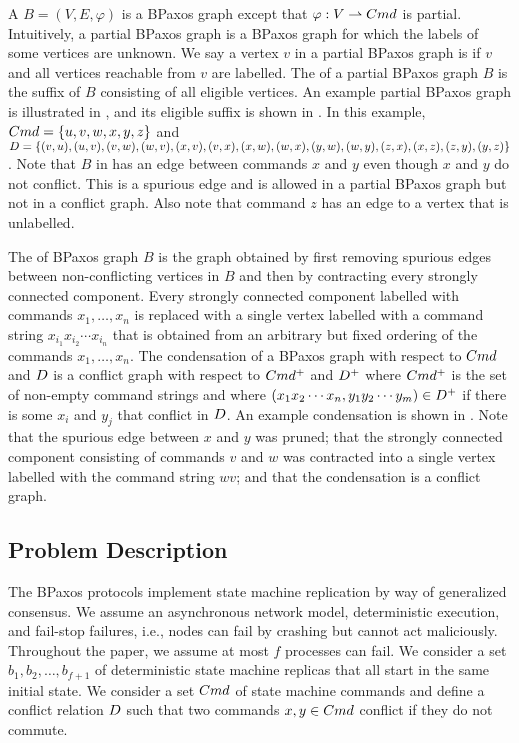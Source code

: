 A  $B = (V, E, \varphi)$ is a BPaxos graph except
that $\varphi: V \rightharpoonup Cmd$ is partial. Intuitively, a partial BPaxos
graph is a BPaxos graph for which the labels of some vertices are unknown.
%
We say a vertex $v$ in a partial BPaxos graph is  if $v$ and
all vertices reachable from $v$ are labelled. The  of
a partial BPaxos graph $B$ is the suffix of $B$ consisting of all eligible
vertices.
%
An example partial BPaxos graph is illustrated in ,
and its eligible suffix is shown in . In this example,
$Cmd = \{u, v, w, x, y, z\}$ and
  $D = \{
    (v, u), (u, v),
    (v, w), (w, v),
    (x, v), (v, x),
    (x, w), (w, x),
    (y, w), (w, y),
    (z, x), (x, z),
    (z, y), (y, z)
  \}$.
Note that $B$ in  has an edge between commands $x$
and $y$ even though $x$ and $y$ do not conflict. This is a spurious edge and is
allowed in a partial BPaxos graph but not in a conflict graph. Also note that
command $z$ has an edge to a vertex that is unlabelled.



The  of BPaxos graph $B$ is the graph obtained by first
removing spurious edges between non-conflicting vertices in $B$ and then by
contracting every strongly connected component. Every strongly connected
component labelled with commands $x_1, \ldots, x_n$ is replaced with a single
vertex labelled with a command string $x_{i_1} x_{i_2} \cdots x_{i_n}$ that is
obtained from an arbitrary but fixed ordering of the commands $x_1, \ldots,
x_n$.
%
The condensation of a BPaxos graph with respect to $Cmd$ and $D$ is
a conflict graph with respect to $Cmd^+$ and $D^+$ where $Cmd^+$ is
the set of non-empty command strings and where $(x_1 x_2 \cdots x_n, y_1 y_2
\cdots y_m) \in D^+$ if there is some $x_i$ and $y_j$ that conflict in
$D$.
%
An example condensation is shown in . Note that the
spurious edge between $x$ and $y$ was pruned; that the strongly connected
component consisting of commands $v$ and $w$ was contracted into a single
vertex labelled with the command string $wv$; and that the condensation is a
conflict graph.

\subsection{Problem Description}
The BPaxos protocols implement state machine replication by way of generalized
consensus. We assume an asynchronous network model, deterministic execution,
and fail-stop failures, i.e., nodes can fail by crashing but cannot act
maliciously. Throughout the paper, we assume at most $f$ processes can fail. We
consider a set $b_1, b_2, \ldots, b_{f+1}$ of deterministic state machine
replicas that all start in the same initial state. We consider a set $Cmd$ of
state machine commands and define a conflict relation $D$ such that two
commands $x, y \in Cmd$ conflict if they do not commute.

